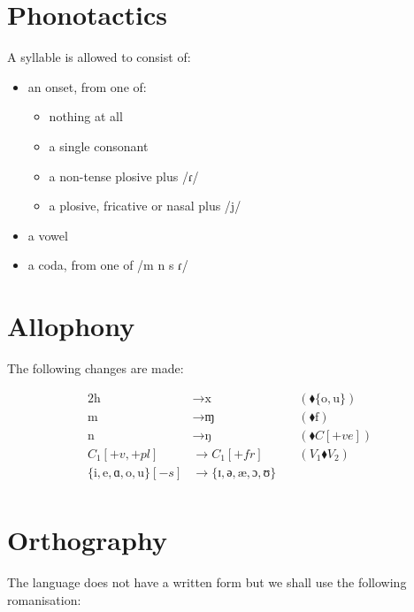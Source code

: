 \documentclass{book}
\begin{document}
\section{Phonotactics}

A syllable is allowed to consist of:

\begin{itemize}
    \item an onset, from one of:
    \begin{itemize}
        \item nothing at all
        \item a single consonant
        \item a non-tense plosive plus /ɾ/
        \item a plosive, fricative or nasal plus /j/
    \end{itemize}
    \item a vowel
    \item a coda, from one of /m n s ɾ/
\end{itemize}

\section{Allophony}

The following changes are made:

\begin{alignat*}{2}
  \text{h} &\rightarrow \text{x} &\quad(\blacklozenge \{\text{o}, \text{u}\}) \\
  \text{m} &\rightarrow \text{ɱ} &\quad(\blacklozenge \text{f}) \\
  \text{n} &\rightarrow \text{ŋ} &\quad(\blacklozenge C[+ve]) \\
  C_1[+v, +pl] &\rightarrow C_1[+fr] &\quad(V_1 \blacklozenge V_2) \\
  \{\text{i}, \text{e}, \text{ɑ}, \text{o}, \text{u}\}[-s]
  &\rightarrow \{\text{ɪ}, \text{ə}, \text{æ}, \text{ɔ}, \text{ʊ}\} &\quad \\
\end{alignat*}

\section{Orthography}

The language does not have a written form but we shall use the following romanisation:
\end{document}

